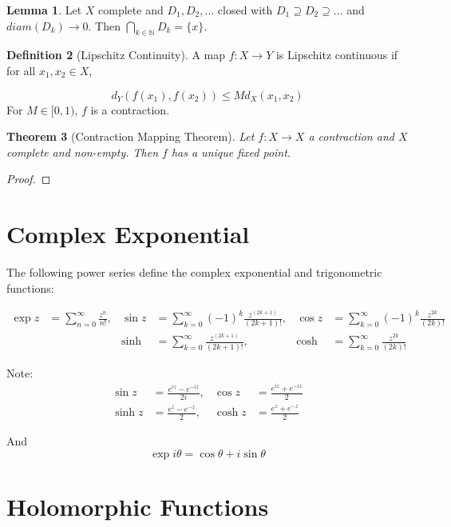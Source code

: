 \documentclass[11pt,a4paper, titlepage]{article}
\newtheorem{theorem}{Theorem}[section]
\theoremstyle{definition}
\newtheorem{definition}[theorem]{Definition}
\newtheorem{lemma}[theorem]{Lemma}
\begin{document}
\begin{lemma}
Let $X$ complete and $D_1, D_2, \ldots$ closed with $D_1 \supseteq D_2 \supseteq \ldots$ and $diam(D_k) \to 0$. Then $\bigcap_{k \in \mathbb{N}} D_k = \{x\}$.
\end{lemma}

\begin{definition}[Lipschitz Continuity]
A map $f \colon X \longrightarrow Y$ is Lipschitz continuous if for all $x_1, x_2 \in X$,

\[
	d_Y(f(x_1),f(x_2)) \leqslant M d_X(x_1,x_2)
\]
For $M \in [0,1)$, $f$ is a contraction.
\end{definition}

\begin{theorem}[Contraction Mapping Theorem]

Let $f \colon X \longrightarrow X$ a contraction and $X$ complete and non-empty. Then $f$ has a unique fixed point.
\end{theorem}

\begin{proof}


\end{proof}

\section{Complex Exponential}

The following power series define the complex exponential and trigonometric functions:

\begin{align*}
	\exp z &= \sum_{n = 0}^\infty \frac{z^n}{n!}, & \sin z &= \sum_{k = 0}^\infty (-1)^k\frac{z^{(2k+1)}}{(2k + 1)!},& \cos z &= \sum_{k = 0}^\infty (-1)^k\frac{z^{2k}}{(2k)!} \\
 	&& \sinh &= \sum_{k = 0}^\infty \frac{z^{(2k+1)}}{(2k + 1)!}, &\cosh &= \sum_{k = 0}^\infty \frac{z^{2k}}{(2k)!}
\end{align*}

Note:
\begin{align*}
\sin z &= \frac{e^{iz} - e^{-iz}}{2i}, & \cos z &= \frac{e^{iz} + e^{-iz}}{2} \\
\sinh z &= \frac{e^{z} - e^{-z}}{2}, & \cosh z &= \frac{e^{z} + e^{-z}}{2}
\end{align*}

And
\[
	\exp i \theta = \cos \theta + i \sin \theta
\]
	


\section{Holomorphic Functions}
\end{document}
